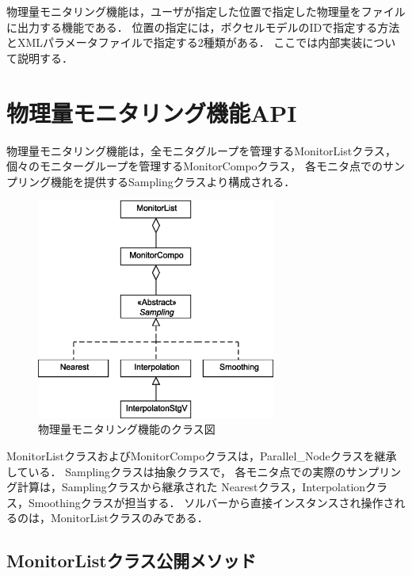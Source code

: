 \graphicspath{{./fig_Sample/}}


物理量モニタリング機能は，ユーザが指定した位置で指定した物理量をファイルに出力する機能である．
位置の指定には，ボクセルモデルのIDで指定する方法とXMLパラメータファイルで指定する2種類がある．
ここでは内部実装について説明する．

\section{物理量モニタリング機能API}
物理量モニタリング機能は，全モニタグループを管理するMonitorListクラス，
個々のモニターグループを管理するMonitorCompoクラス，
各モニタ点でのサンプリング機能を提供するSamplingクラスより構成される．

\begin{figure}[H]
\vspace{0.5cm}
\begin{center}
\includegraphics[width=0.7\textwidth]{Monitor.eps}
\caption{物理量モニタリング機能のクラス図}
\label{fig:monitor}
\end{center}
\end{figure}

MonitorListクラスおよびMonitorCompoクラスは，Parallel\_Nodeクラスを継承している．
Samplingクラスは抽象クラスで，
各モニタ点での実際のサンプリング計算は，Samplingクラスから継承された
Nearestクラス，Interpolationクラス，Smoothingクラスが担当する．
ソルバーから直接インスタンスされ操作されるのは，MonitorListクラスのみである．

\pagebreak
\subsection{MonitorListクラス公開メソッド}
%
\vspace{2mm}

